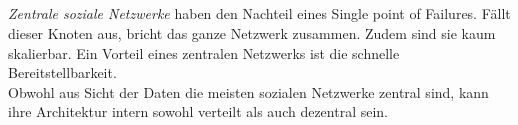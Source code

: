 	\subsection{
		\label{sub:difference}
	}
	\textit{Zentrale soziale Netzwerke} haben den Nachteil eines \glqq Single point of Failures\grqq. Fällt dieser Knoten aus, bricht das ganze Netzwerk zusammen. Zudem sind sie kaum skalierbar. Ein Vorteil eines zentralen Netzwerks ist die schnelle Bereitstellbarkeit.\\
	
	Obwohl aus Sicht der Daten die meisten sozialen Netzwerke zentral sind, kann ihre Architektur intern sowohl verteilt als auch dezentral sein.\\
